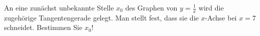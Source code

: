 \item An eine zunächst unbekannte Stelle $x_0$ des Graphen von $y=\frac{1}{x}$ wird die zugehörige Tangentengerade gelegt. Man stellt fest, dass sie die $x$-Achse bei $x=7$ schneidet. Bestimmen Sie $x_0$!
